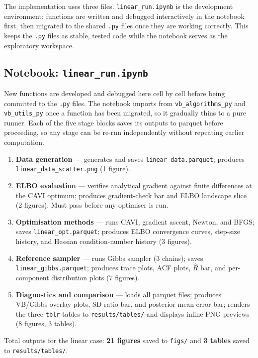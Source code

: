 \documentclass[11pt,a4paper]{article}
\begin{document}
The implementation uses three files. \texttt{linear\_run.ipynb} is the development environment:
functions are written and debugged interactively in the notebook first, then migrated to the
shared \texttt{.py} files once they are working correctly. This keeps the \texttt{.py} files
as stable, tested code while the notebook serves as the exploratory workspace.

\subsection*{Notebook: \texttt{linear\_run.ipynb}}

New functions are developed and debugged here cell by cell before being committed to the
\texttt{.py} files. The notebook imports from \texttt{vb\_algorithms\_py} and
\texttt{vb\_utils\_py} once a function has been migrated, so it gradually thins to a pure
runner. Each of the five stage blocks saves its outputs to parquet before proceeding, so any
stage can be re-run independently without repeating earlier computation.

\begin{enumerate}
  \item \textbf{Data generation} — generates and saves \texttt{linear\_data.parquet}; produces \texttt{linear\_data\_scatter.png} (1 figure).
  \item \textbf{ELBO evaluation} — verifies analytical gradient against finite differences at the CAVI optimum; produces gradient-check bar and ELBO landscape slice (2 figures). Must pass before any optimiser is run.
  \item \textbf{Optimisation methods} — runs CAVI, gradient ascent, Newton, and BFGS; saves \texttt{linear\_opt.parquet}; produces ELBO convergence curves, step-size history, and Hessian condition-number history (3 figures).
  \item \textbf{Reference sampler} — runs Gibbs sampler (3 chains); saves \texttt{linear\_gibbs.parquet}; produces trace plots, ACF plots, $\hat{R}$ bar, and per-component distribution plots (7 figures).
  \item \textbf{Diagnostics and comparison} — loads all parquet files; produces VB/Gibbs overlay plots, SD-ratio bar, and posterior mean-error bar; renders the three \texttt{tblr} tables to \texttt{results/tables/} and displays inline PNG previews (8 figures, 3 tables).
\end{enumerate}

\noindent Total outputs for the linear case: \textbf{21 figures} saved to \texttt{figs/} and \textbf{3 tables} saved to \texttt{results/tables/}.
\end{document}
